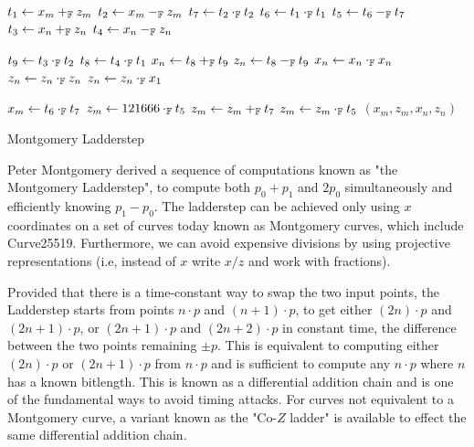 \begin{algorithm}[h]
\label{evaluation:ladder-step:montgomery}
\begin{algorithmic}[1]
\begin{multicols}{3}
\State $t_1 \leftarrow x_m +_{\mathbb{F}} z_m$
\State $t_2 \leftarrow x_m -_{\mathbb{F}} z_m$
\State $t_7 \leftarrow t_2 \cdot_{\mathbb{F}} t_2$
\State $t_6 \leftarrow t_1 \cdot_{\mathbb{F}} t_1$
\State $t_5 \leftarrow t_6 -_{\mathbb{F}} t_7$
\State $t_3 \leftarrow x_n +_{\mathbb{F}} z_n$
\State $t_4 \leftarrow x_n -_{\mathbb{F}} z_n$\rule{0ex}{0ex}
\State $t_9 \leftarrow t_3 \cdot_{\mathbb{F}} t_2$
\State $t_8 \leftarrow t_4 \cdot_{\mathbb{F}} t_1$
\State $x_n \leftarrow t_8 +_{\mathbb{F}} t_9$
\State $z_n \leftarrow t_8 -_{\mathbb{F}} t_9$
\State $x_n \leftarrow x_{n} \cdot_{\mathbb{F}} x_{n}$
\State $z_n \leftarrow z_{n} \cdot_{\mathbb{F}} z_{n}$
\State $z_n \leftarrow z_{n} \cdot_{\mathbb{F}} x_1$\rule{0ex}{0ex} 
\State $x_m \leftarrow t_6 \cdot_{\mathbb{F}} t_7$
\State $z_m \leftarrow 121666 \cdot_{\mathbb{F}} t_5$
\State $z_m \leftarrow z_m +_{\mathbb{F}} t_7$
\State $z_m \leftarrow z_m \cdot_{\mathbb{F}} t_5$
\State \Return $(x_m, z_m, x_n, z_n)$
\EndFunction
\end{multicols}
\end{algorithmic}
\caption{Montgomery Ladderstep}
\end{algorithm}

Peter Montgomery derived a sequence of computations known
as "the Montgomery Ladderstep", to compute both $p_0+p_1$ and $2p_0$
simultaneously and efficiently knowing $p_1-p_0$.  The ladderstep can
be achieved only using $x$ coordinates on a set of curves today known as
Montgomery curves, which include Curve25519.  Furthermore, we can
avoid expensive divisions by using projective representations (i.e,
instead of $x$ write $x/z$ and work  with fractions).  

Provided that there is a time-constant way to swap the two input
points, the Ladderstep starts from points $n \cdot p $ and
$ (n+1) \cdot p $, to get either $ (2n) \cdot p $ and
$(2n+1) \cdot p$, or $(2n+1) \cdot p$ and $(2n+2) \cdot p$ in constant
time, the difference between the two points remaining $\pm p$.  This
is equivalent to computing either $(2n) \cdot p$ or $(2n+1) \cdot p$
from $n \cdot p$ and is sufficient to compute any $n \cdot p$ where
$n$ has a known bitlength.  This is known as a differential
addition chain and is one of the fundamental ways to avoid timing
attacks.  For curves not equivalent to a Montgomery curve, a variant
known as the "Co-$Z$ ladder" is available to effect the same
differential addition chain.

